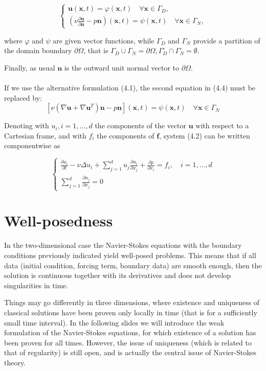 \documentclass[11pt]{book}
\begin{document}
\begin{equation}
\left\{\begin{array}{l}
\mathbf{u}(\mathbf{x}, t)=\varphi(\mathbf{x}, t) \quad \forall \mathbf{x} \in \Gamma_{D}, \\
\left(\nu \frac{\partial \mathbf{u}}{\partial \mathbf{n}}-p \mathbf{n}\right)(\mathbf{x}, t)=\psi(\mathbf{x}, t) \quad \forall \mathbf{x} \in \Gamma_{N},
\end{array}\right.
\end{equation}

where $\varphi$ and $\psi$ are given vector functions, while $\Gamma_{D}$ and $\Gamma_{N}$ provide a partition of the domain boundary $\partial \Omega$, that is $\Gamma_{D} \cup \Gamma_{N}=\partial \Omega, \Gamma_{D}^{\circ} \cap \Gamma_{N}^{\circ}=\emptyset$. 

Finally, as usual $\mathbf{n}$ is the outward unit normal vector to $\partial \Omega$.\\ \\
If we use the alternative formulation (4.1), the second equation in (4.4) must be replaced by:
$$
\left[\nu\left(\nabla \mathbf{u}+\nabla \mathbf{u}^{T}\right) \mathbf{n}-p \mathbf{n}\right](\mathbf{x}, t)=\psi(\mathbf{x}, t) \quad \forall \mathbf{x} \in \Gamma_{N}
$$

Denoting with $u_{i}, i=1, \ldots, d$ the components of the vector $\mathbf{u}$ with respect to a Cartesian frame, and with $f_{i}$ the components of $\mathbf{f}$, system (4.2) can be written componentwise as

$$
\left\{\begin{array}{l}
\frac{\partial u_{i}}{\partial t}-\nu \Delta u_{i}+\sum_{j=1}^{d} u_{j} \frac{\partial u_{i}}{\partial x_{j}}+\frac{\partial p}{\partial x_{i}}=f_{i}, \quad i=1, \ldots, d \\
\sum_{j=1}^{d} \frac{\partial u_{j}}{\partial x_{j}}=0
\end{array}\right.
$$

\section{Well-posedness}
In the two-dimensional case the Navier-Stokes equations with the boundary conditions previously indicated yield well-posed problems. This means that if all data (initial condition, forcing term, boundary data) are smooth enough, then the solution is continuous together with its derivatives and does not develop singularities in time.

Things may go differently in three dimensions, where existence and uniqueness of classical solutions have been proven only locally in time (that is for a sufficiently small time interval). In the following slides we will introduce the weak formulation of the Navier-Stokes equations, for which existence of a solution has been proven for all times. However, the issue of uniqueness (which is related to that of regularity) is still open, and is actually the central issue of Navier-Stokes theory.
\end{document}
